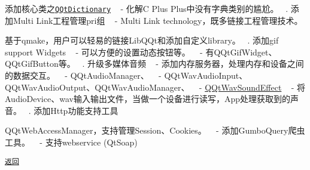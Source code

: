\begin{DoxyEnumerate}
\item 添加核心类之\href{src/core/qqtdictionary.h}{\tt Q\+Qt\+Dictionary} ~\newline
 -\/ 化解C Plus Plus中没有字典类别的尴尬。 ~. 添加\+Multi Link工程管理pri组 ~\newline
 -\/ Multi Link technology，既多链接工程管理技术。
\begin{DoxyItemize}
\item 基于qmake，用户可以轻易的链接\+Lib\+Q\+Qt和添加自定义library。 ~. 添加gif support Widgets ~\newline
 -\/ 可以方便的设置动态按钮等。 ~\newline
 -\/ 有\+Q\+Qt\+Gif\+Widget、\+Q\+Qt\+Gif\+Button等。 ~. 升级多媒体音频 ~\newline
 -\/ 添加内存服务器，处理内存和设备之间的数据交互。 ~\newline
 -\/ Q\+Qt\+Audio\+Manager、 ~\newline
 -\/ Q\+Qt\+Wav\+Audio\+Input、\+Q\+Qt\+Wav\+Audio\+Output、\+Q\+Qt\+Wav\+Audio\+Manager、 ~\newline
 -\/ \mbox{\hyperlink{class_q_qt_wav_sound_effect}{Q\+Qt\+Wav\+Sound\+Effect}} ~\newline
 -\/ 将\+Audio\+Device、wav输入输出文件，当做一个设备进行读写，\+App处理获取到的声音。 ~. 添加\+Http功能支持工具
\end{DoxyItemize}
\end{DoxyEnumerate}

Q\+Qt\+Web\+Access\+Manager，支持管理\+Session、\+Cookies。 ~\newline
 -\/ 添加\+Gumbo\+Query爬虫工具。 ~\newline
 -\/ 支持webservice (Qt\+Soap) ~\newline


\href{.}{\tt 返回} 
